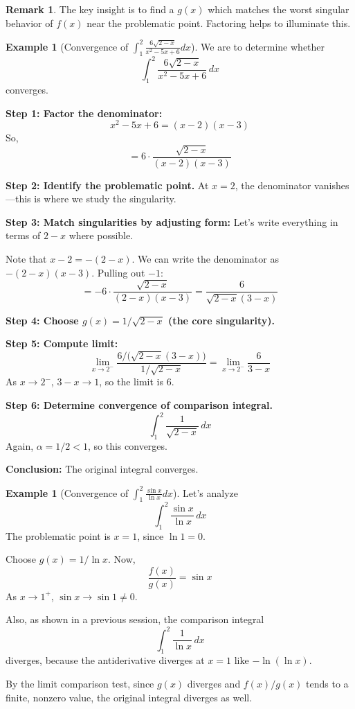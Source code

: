 \documentclass[12pt]{article}
\theoremstyle{definition}
\newtheorem{example}[theorem]{Example}
\newtheorem{remark}[theorem]{Remark}
\begin{document}
\begin{remark}
The key insight is to find a $g(x)$ which matches the worst singular behavior of $f(x)$ near the problematic point. Factoring helps to illuminate this.
\end{remark}

\vspace{0.2cm}

\begin{example}[Convergence of $\int_1^2 \frac{6\sqrt{2-x}}{x^2 - 5x + 6} dx$]
We are to determine whether
\[
\int_1^2 \frac{6 \sqrt{2 - x}}{x^2 - 5x + 6}\, dx
\]
converges.

\textbf{Step 1: Factor the denominator:}
\[
x^2 - 5x + 6 = (x - 2)(x - 3)
\]
So,
\[
= 6 \cdot \frac{\sqrt{2 - x}}{(x - 2)(x - 3)}
\]

\textbf{Step 2: Identify the problematic point.} At $x = 2$, the denominator vanishes---this is where we study the singularity.

\textbf{Step 3: Match singularities by adjusting form:}
Let’s write everything in terms of $2-x$ where possible.

Note that $x - 2 = -(2 - x)$. We can write the denominator as $-(2 - x)(x - 3)$. Pulling out $-1$:
\[
= -6 \cdot \frac{\sqrt{2 - x}}{(2 - x)(x - 3)} = \frac{6}{\sqrt{2 - x}(3 - x)}
\]

\textbf{Step 4: Choose $g(x) = 1/\sqrt{2 - x}$ (the core singularity).}

\textbf{Step 5: Compute limit:}
\[
\lim_{x \to 2^-} \frac{6/\bigl(\sqrt{2 - x}(3 - x)\bigr)}{1/\sqrt{2 - x}} = \lim_{x \to 2^-} \frac{6}{3 - x}
\]
As $x\to 2^-$, $3-x \to 1$, so the limit is $6$.

\textbf{Step 6: Determine convergence of comparison integral.}
\[
\int_1^2 \frac{1}{\sqrt{2-x}}\, dx
\]
Again, $\alpha = 1/2 < 1$, so this converges.

\textbf{Conclusion:} The original integral converges.
\end{example}

\vspace{0.2cm}

\begin{example}[Convergence of $\int_1^2 \frac{\sin x}{\ln x} dx$]
Let’s analyze
\[
\int_1^2 \frac{\sin x}{\ln x}\, dx
\]
The problematic point is $x = 1$, since $\ln 1 = 0$.

Choose $g(x) = 1/\ln x$. Now,
\[
\frac{f(x)}{g(x)} = \sin x
\]
As $x \to 1^+$, $\sin x \to \sin 1 \neq 0$.

Also, as shown in a previous session, the comparison integral
\[
\int_1^2 \frac{1}{\ln x}\, dx
\]
diverges, because the antiderivative diverges at $x = 1$ like $-\ln (\ln x)$.

By the limit comparison test, since $g(x)$ diverges and $f(x)/g(x)$ tends to a finite, nonzero value, the original integral diverges as well.
\end{example}
\end{document}
